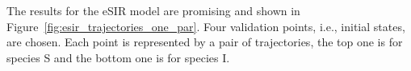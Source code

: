 \documentclass{article}
\begin{document}
The results for the eSIR model are promising and shown in Figure~\ref{fig:esir_trajectories_one_par}. Four validation points, i.e., initial states, are chosen. Each point is represented by a pair of trajectories, the top one is for species S and the bottom one is for species I.
\begin{figure}[ht]
    \centering
\end{figure}
\end{document}
